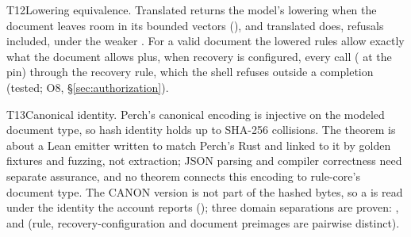 \begin{perchstatement}{T12}{Lowering equivalence.}\label{stmt:lowering-equivalence}
Translated  returns the model's lowering when the document leaves room in its bounded vectors (), and translated  does, refusals included, under the weaker . For a valid document the lowered rules allow exactly what the document allows plus, when recovery is configured, every  call ( at the pin) through the recovery rule, which the shell refuses outside a completion (tested; O8, \S\ref{sec:authorization}).
\end{perchstatement}
\begin{perchstatement}{T13}{Canonical identity.}\label{stmt:canonical-identity}
Perch's canonical encoding is injective on the modeled document type, so hash identity holds up to SHA-256 collisions. The theorem is about a Lean emitter written to match Perch's Rust  and linked to it by golden fixtures and fuzzing, not extraction; JSON parsing and compiler correctness need separate assurance, and no theorem connects this encoding to rule-core's document type. The CANON version is not part of the hashed bytes, so a  is read under the identity the account reports (); three domain separations are proven: ,  and  (rule, recovery-configuration and document preimages are pairwise distinct).
\end{perchstatement}
